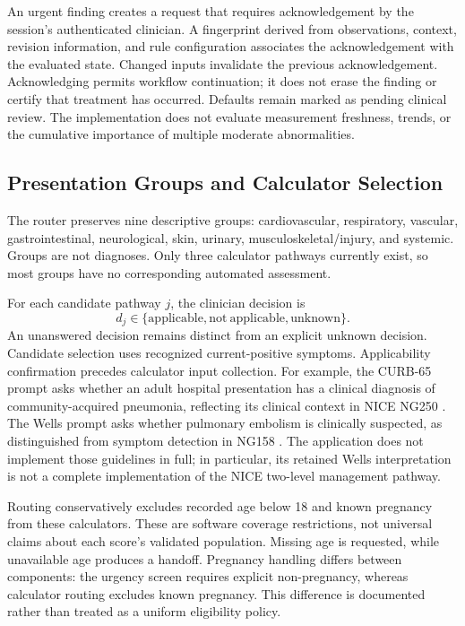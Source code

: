 \documentclass[conference]{IEEEtran}
\begin{document}
An urgent finding creates a request that requires acknowledgement by the session's authenticated clinician. A fingerprint derived from observations, context, revision information, and rule configuration associates the acknowledgement with the evaluated state. Changed inputs invalidate the previous acknowledgement. Acknowledging permits workflow continuation; it does not erase the finding or certify that treatment has occurred. Defaults remain marked as pending clinical review. The implementation does not evaluate measurement freshness, trends, or the cumulative importance of multiple moderate abnormalities.

\subsection{Presentation Groups and Calculator Selection}
The router preserves nine descriptive groups: cardiovascular, respiratory, vascular, gastrointestinal, neurological, skin, urinary, musculoskeletal/injury, and systemic. Groups are not diagnoses. Only three calculator pathways currently exist, so most groups have no corresponding automated assessment.

For each candidate pathway $j$, the clinician decision is
\begin{equation}
d_j\in\{\mathrm{applicable},\mathrm{not\ applicable},\mathrm{unknown}\}.
\end{equation}
An unanswered decision remains distinct from an explicit unknown decision. Candidate selection uses recognized current-positive symptoms. Applicability confirmation precedes calculator input collection. For example, the CURB-65 prompt asks whether an adult hospital presentation has a clinical diagnosis of community-acquired pneumonia, reflecting its clinical context in NICE NG250 \cite{nicepneumonia}. The Wells prompt asks whether pulmonary embolism is clinically suspected, as distinguished from symptom detection in NG158 \cite{nicepe}. The application does not implement those guidelines in full; in particular, its retained Wells interpretation is not a complete implementation of the NICE two-level management pathway.

Routing conservatively excludes recorded age below 18 and known pregnancy from these calculators. These are software coverage restrictions, not universal claims about each score's validated population. Missing age is requested, while unavailable age produces a handoff. Pregnancy handling differs between components: the urgency screen requires explicit non-pregnancy, whereas calculator routing excludes known pregnancy. This difference is documented rather than treated as a uniform eligibility policy.
\end{document}
